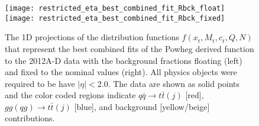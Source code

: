 \documentclass{cmspaperpdf}
\begin{document}
 \begin{figure}[hbt]
  \begin{center}
    \texttt{[image: restricted\_eta\_best\_combined\_fit\_Rbck\_float]}
    \texttt{[image: restricted\_eta\_best\_combined\_fit\_Rbck\_fixed]}
  \caption{\small The 1D projections of the distribution functions $f(x_\mathrm{r},M_\mathrm{r},c_\mathrm{r},Q,N)$ that represent the best combined fits of the Powheg derived function to the 2012A-D data with the background fractions floating (left) and fixed to the nominal values (right). All physics objects were required to be have $|\eta|<2.0$. The data are shown as solid points and the color coded regions indicate $q\bar q\to t\bar t(j)$ [red], $gg(qg)\to t\bar t(j)$ [blue], and background [yellow/beige] contributions.}
    \label{fig:restricted_eta_space}
  \end{center}
\end{figure}
\end{document}
